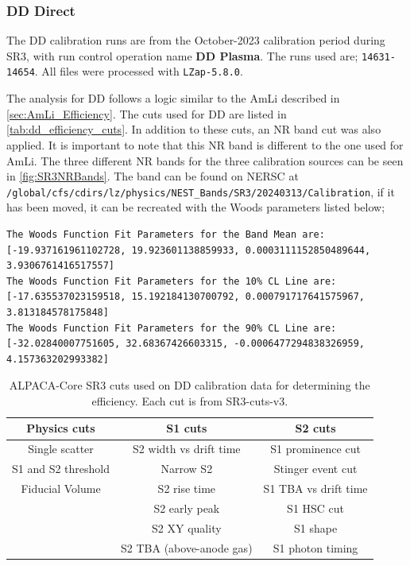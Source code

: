 \subsubsection{DD Direct}
The DD calibration runs are from the October-2023 calibration period during SR3, with run control operation name \textbf{DD Plasma}.
The runs used are; \lstinline{14631-14654}.
All files were processed with \lstinline{LZap-5.8.0}.

The analysis for DD follows a logic similar to the AmLi described in \autoref{sec:AmLi_Efficiency}.
The cuts used for DD are listed in \autoref{tab:dd_efficiency_cuts}.
In addition to these cuts, an NR band cut was also applied. 
It is important to note that this NR band is different to the one used for AmLi. The three different NR bands for the three calibration sources can be seen in \autoref{fig:SR3NRBands}.
The band can be found on NERSC at \lstinline{/global/cfs/cdirs/lz/physics/NEST_Bands/SR3/20240313/Calibration}, if it has been moved, it can be recreated with the Woods parameters listed below;
\begin{lstlisting}
The Woods Function Fit Parameters for the Band Mean are:  [-19.937161961102728, 19.923601138859933, 0.0003111152850489644, 3.9306761416517557]
The Woods Function Fit Parameters for the 10% CL Line are:  [-17.635537023159518, 15.192184130700792, 0.000791717641575967, 3.813184578175848]
The Woods Function Fit Parameters for the 90% CL Line are:  [-32.02840007751605, 32.68367426603315, -0.0006477294838326959, 4.157363202993382]
\end{lstlisting}
\begin{table}
    \centering
    \begin{tabular}{c|c|c}
     Physics cuts & S1 cuts & S2 cuts  \\
     \hline
     Single scatter  & S2 width vs drift time & S1 prominence cut \\
     S1 and S2 threshold & Narrow S2 & Stinger event cut \\
     Fiducial Volume & S2 rise time & S1 TBA vs drift time \\
     & S2 early peak & S1 HSC cut \\
     & S2 XY quality & S1 shape \\
     & S2 TBA (above-anode gas) & S1 photon timing \\
    \end{tabular}
    \caption{ALPACA-Core SR3 cuts used on DD calibration data for determining the efficiency.
    Each cut is from SR3-cuts-v3.
    }
    \label{tab:dd_efficiency_cuts}
\end{table}
